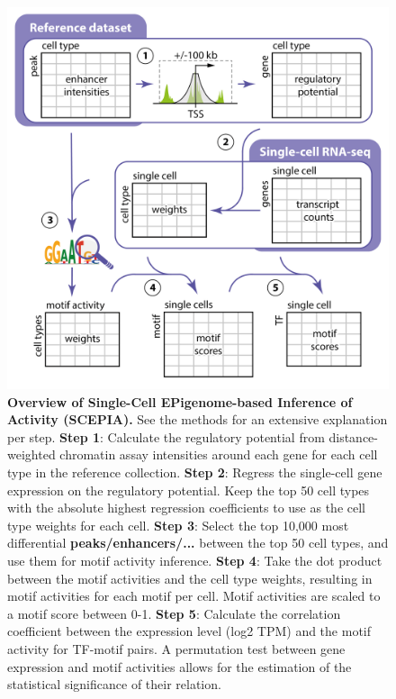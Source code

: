 \begin{figure}
    \centering
    \includegraphics[width=1\linewidth]{ch.scepia/imgs/OverviewFigure_SvH_Myriad_v6_Figure2.png}
    \caption{\textbf{Overview of Single-Cell EPigenome-based Inference of Activity (SCEPIA).} See the methods for an extensive explanation per step. \newline 
    \textbf{Step 1}: Calculate the regulatory potential from distance-weighted chromatin assay intensities around each gene for each cell type in the reference collection.
    \textbf{Step 2}: Regress the single-cell gene expression on the regulatory potential. Keep the top 50 cell types with the absolute highest regression coefficients to use as the cell type weights for each cell.
    \textbf{Step 3}: Select the top 10,000 most differential \textbf{peaks/enhancers/...} between the top 50 cell types, and use them for motif activity inference.
    \textbf{Step 4}: Take the dot product between the motif activities and the cell type weights, resulting in motif activities for each motif per cell. Motif activities are scaled to a motif score between 0-1. 
    \textbf{Step 5}: Calculate the correlation coefficient between the expression level (log2 TPM) and the motif activity for TF-motif pairs. A permutation test between gene expression and motif activities allows for the estimation of the statistical significance of their relation.}
    \label{fig:scepia_overview}
\end{figure}

